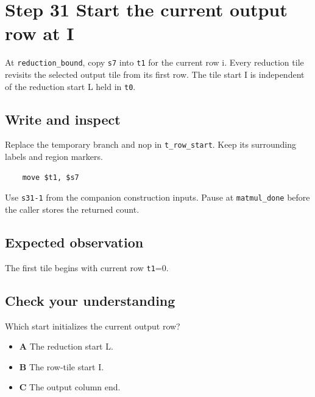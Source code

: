 \section{Step 31 Start the current output row at I}\label{matmul-s31}

At \texttt{reduction\_bound}, copy \texttt{s7} into \texttt{t1} for the current row i. Every reduction tile revisits the selected output tile from its first row. The tile start I is independent of the reduction start L held in \texttt{t0}.

\subsection{Write and inspect}
Replace the temporary branch and nop in \texttt{t\_row\_start}. Keep its surrounding labels and region markers.

\begin{verbatim}
    move $t1, $s7
\end{verbatim}
Use \texttt{s31-1} from the companion construction inputs. Pause at \texttt{matmul\_done} before the caller stores the returned count.

\subsection{Expected observation}
The first tile begins with current row \texttt{t1}=0.

\subsection{Check your understanding}
Which start initializes the current output row?

\begin{itemize}
  \item \textbf{A} The reduction start L.
  \item \textbf{B} The row-tile start I.
  \item \textbf{C} The output column end.
\end{itemize}
